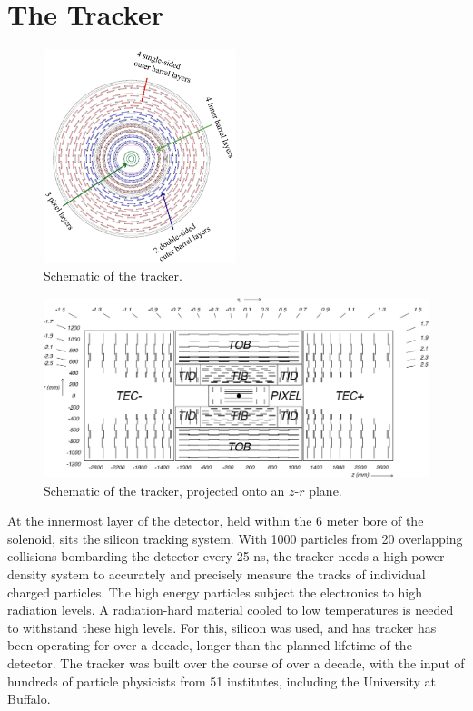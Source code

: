 \vspace{-3pt}
\section{The Tracker}\label{sec:ch3:trk}


\begin{figure}[h]
\centering
\includegraphics[width=0.5\textwidth]{figures/Barrel_0_tracker.png}
\caption{Schematic of the tracker.}
\label{fig:tracker_circular_schematic}
\end{figure}

 \begin{figure}[h]
\centering
\includegraphics[width=1.0\textwidth]{figures/cms_tracker_cross_section_schematic.jpg}
\caption{Schematic of the tracker, projected onto an $z$-$r$ plane.}
\label{fig:cms_tracker_cross_section_schematic}
\end{figure}

At the innermost layer of the detector, held within the 6 meter bore of the solenoid, sits the silicon tracking system. With 1000 particles from 20 overlapping collisions bombarding the detector every 25 ns, the tracker needs a high power density system to accurately and precisely measure the tracks of individual charged particles. The high energy particles subject the electronics to high radiation levels. A radiation-hard material cooled to low temperatures is needed to withstand these high levels. For this, silicon was used, and has tracker has been operating for over a decade, longer than the planned lifetime of the detector. The tracker was built over the course of over a decade, with the input of hundreds of particle physicists from 51 institutes, including the University at Buffalo.


